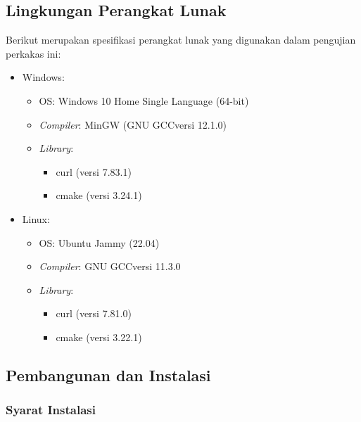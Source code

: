 \subsection{Lingkungan Perangkat Lunak}
\label{sec:testing-experiments-software}

Berikut merupakan spesifikasi perangkat lunak yang digunakan dalam pengujian perkakas ini:

\begin{itemize}
	\item Windows:
	
	\begin{itemize}
		\item OS: Windows 10 Home Single Language (64-bit)
		\item \textit{Compiler}: MinGW (GNU GCC\textemdash versi 12.1.0)
		\item \textit{Library}:
		
		\begin{itemize}
			\item curl (versi 7.83.1)
			\item cmake (versi 3.24.1)
		\end{itemize}
		
	\end{itemize}
	
	\item Linux:
	
	\begin{itemize}
		\item OS: Ubuntu Jammy (22.04)
		\item \textit{Compiler}: GNU GCC\textemdash versi 11.3.0
		\item \textit{Library}:
		
		\begin{itemize}
			\item curl (versi 7.81.0)
			\item cmake (versi 3.22.1)
		\end{itemize}
		
	\end{itemize}
	
\end{itemize}

\subsection{Pembangunan dan Instalasi}
\label{sec:testing-experiments-installation}

\subsubsection{Syarat Instalasi}
\label{sec:testing-experiments-installation-requirements}

